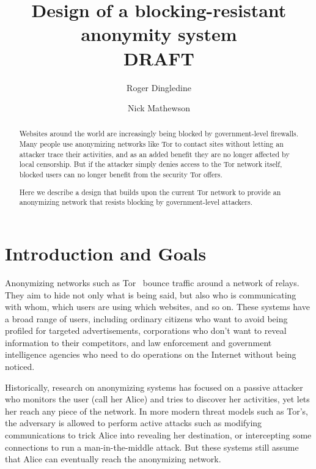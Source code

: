 \documentclass{llncs}
\begin{document}
\title{Design of a blocking-resistant anonymity system\\DRAFT}

\author{Roger Dingledine \and Nick Mathewson}

\maketitle
\pagestyle{plain}

\begin{abstract}

Websites around the world are increasingly being blocked by
government-level firewalls. Many people use anonymizing networks like
Tor to contact sites without letting an attacker trace their activities,
and as an added benefit they are no longer affected by local censorship.
But if the attacker simply denies access to the Tor network itself,
blocked users can no longer benefit from the security Tor offers.

Here we describe a design that builds upon the current Tor network
to provide an anonymizing network that resists blocking
by government-level attackers.

\end{abstract}

\section{Introduction and Goals}

Anonymizing networks such as Tor~\cite{tor-design} bounce traffic around
a network of relays. They aim to hide not only what is being said, but
also who is communicating with whom, which users are using which websites,
and so on. These systems have a broad range of users, including ordinary
citizens who want to avoid being profiled for targeted advertisements,
corporations who don't want to reveal information to their competitors,
and law enforcement and government intelligence agencies who need to do
operations on the Internet without being noticed.

Historically, research on anonymizing systems has focused on a passive
attacker who monitors the user (call her Alice) and tries to discover her
activities, yet lets her reach any piece of the network. In more modern
threat models such as Tor's, the adversary is allowed to perform active
attacks such as modifying communications to trick Alice
into revealing her destination, or intercepting some connections
to run a man-in-the-middle attack. But these systems still assume that
Alice can eventually reach the anonymizing network.
\end{document}
